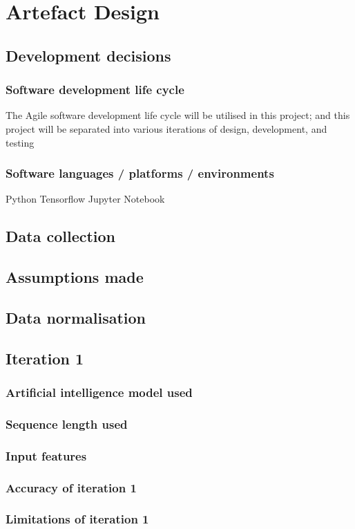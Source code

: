 \chapter{Artefact Design} \label{chap:artefact-design}
\section{Development decisions}
\subsection{Software development life cycle}
The Agile software development life cycle will be utilised in this project; and this project will be separated
into various iterations of design, development, and testing
\subsection{Software languages / platforms / environments}
Python
Tensorflow
Jupyter Notebook
\section{Data collection}
\section{Assumptions made}

\section{Data normalisation}

\section{Iteration 1}
\subsection{Artificial intelligence model used}
\subsection{Sequence length used}
\subsection{Input features}
\subsection{Accuracy of iteration 1}
\subsection{Limitations of iteration 1}